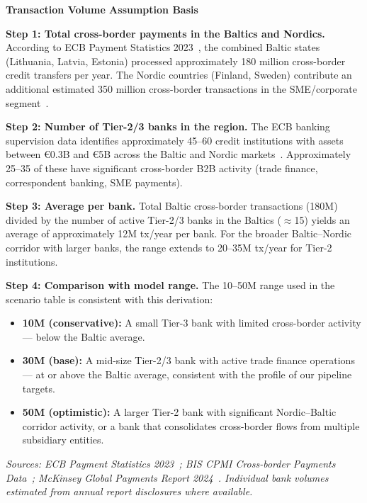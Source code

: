 \documentclass[11pt,a4paper]{article}
\begin{document}
\begin{tcolorbox}[boxbase, colback=insightbg, colframe=insightborder]
\textbf{Transaction Volume Assumption Basis}\\[4pt]
{\small
\textbf{Step 1: Total cross-border payments in the Baltics and Nordics.} According to ECB Payment Statistics 2023~\cite{ecb_payments}, the combined Baltic states (Lithuania, Latvia, Estonia) processed approximately 180 million cross-border credit transfers per year. The Nordic countries (Finland, Sweden) contribute an additional estimated 350 million cross-border transactions in the SME/corporate segment~\cite{bis_crossborder}.

\textbf{Step 2: Number of Tier-2/3 banks in the region.} The ECB banking supervision data identifies approximately 45--60 credit institutions with assets between \euro 0.3B and \euro 5B across the Baltic and Nordic markets~\cite{ecb_payments}. Approximately 25--35 of these have significant cross-border B2B activity (trade finance, correspondent banking, SME payments).

\textbf{Step 3: Average per bank.} Total Baltic cross-border transactions (180M) divided by the number of active Tier-2/3 banks in the Baltics ($\approx$15) yields an average of approximately 12M tx/year per bank. For the broader Baltic--Nordic corridor with larger banks, the range extends to 20--35M tx/year for Tier-2 institutions.

\textbf{Step 4: Comparison with model range.} The 10--50M range used in the scenario table is consistent with this derivation:
\begin{itemize}[leftmargin=1.5em, itemsep=1pt, parsep=0pt]
\item \textbf{10M (conservative):} A small Tier-3 bank with limited cross-border activity --- below the Baltic average.
\item \textbf{30M (base):} A mid-size Tier-2/3 bank with active trade finance operations --- at or above the Baltic average, consistent with the profile of our pipeline targets.
\item \textbf{50M (optimistic):} A larger Tier-2 bank with significant Nordic--Baltic corridor activity, or a bank that consolidates cross-border flows from multiple subsidiary entities.
\end{itemize}

\textit{Sources: ECB Payment Statistics 2023~\cite{ecb_payments}; BIS CPMI Cross-border Payments Data~\cite{bis_crossborder}; McKinsey Global Payments Report 2024~\cite{mckinsey_2024}. Individual bank volumes estimated from annual report disclosures where available.}
}
\end{tcolorbox}
\end{document}
